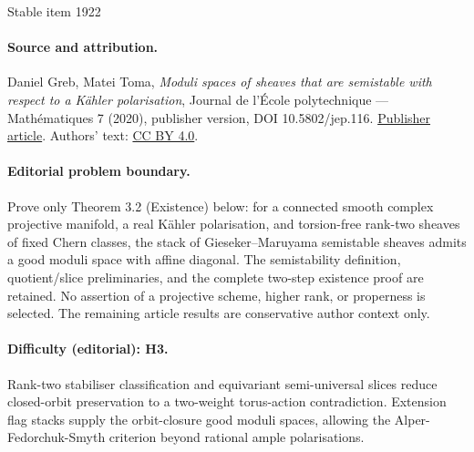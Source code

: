 \documentclass[11pt]{article}
\begin{document}
\begin{center}{\Large Stable item 1922}\end{center}
\paragraph{Source and attribution.}
Daniel Greb, Matei Toma, \emph{Moduli spaces of sheaves that are semistable with respect to a Kähler polarisation}, Journal de l’École polytechnique — Mathématiques 7 (2020), publisher version, DOI 10.5802/jep.116. \href{https://jep.centre-mersenne.org/articles/10.5802/jep.116/}{Publisher article}. Authors' text: \href{https://creativecommons.org/licenses/by/4.0/}{CC BY 4.0}.
\paragraph{Editorial problem boundary.}
Prove only Theorem 3.2 (Existence) below: for a connected smooth complex projective manifold, a real Kähler polarisation, and torsion-free rank-two sheaves of fixed Chern classes, the stack of Gieseker--Maruyama semistable sheaves admits a good moduli space with affine diagonal. The semistability definition, quotient/slice preliminaries, and the complete two-step existence proof are retained. No assertion of a projective scheme, higher rank, or properness is selected. The remaining article results are conservative author context only.
\paragraph{Difficulty (editorial): H3.}
Rank-two stabiliser classification and equivariant semi-universal slices reduce closed-orbit preservation to a two-weight torus-action contradiction. Extension flag stacks supply the orbit-closure good moduli spaces, allowing the Alper-Fedorchuk-Smyth criterion beyond rational ample polarisations.
\end{document}
